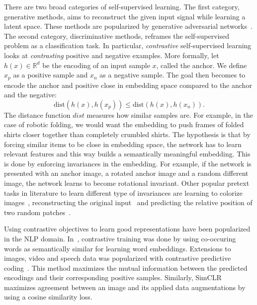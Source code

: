 \documentclass[\home/main.tex]{subfiles}
\begin{document}
There are two broad categories of self-supervised learning. The first category, generative methods, aims to reconstruct the given input signal while learning a latent space. These methods are popularized by generative adversarial networks~\autocite{goodfellow2014generative}. The second category, discriminative methods, reframes the self-supervised problem as a classification task. In particular, \emph{contrastive} self-supervised learning looks at \textit{contrasting} positive and negative examples. More formally, let $h(x) \in \mathbb{R}^d$ be the encoding of an input sample $x$, called the anchor. We define $x_p$ as a positive sample and $x_n$ as a negative sample. The goal then becomes to encode the anchor and positive close in embedding space compared to the anchor and the negative:
\begin{equation*}
	\text{dist}\left( h(x),h(x_p) \right) \leq \text{dist}\left( h(x),h(x_n) \right) .
\end{equation*}
The distance function $\textit{dist}$ measures how similar samples are. For example, in the case of robotic folding, we would want the embedding to push frames of folded shirts closer together than completely crumbled shirts. The hypothesis is that by forcing similar items to be close in embedding space, the network has to learn relevant features and this way builds a semantically meaningful embedding. This is done by enforcing invariances in the embedding. For example, if the network is presented with an anchor image, a rotated anchor image and a random different image, the network learns to become rotational invariant. Other popular pretext tasks in literature to learn different type of invariances are learning to colorize images~\cite{Zhang2016Color}, reconstructing the original input~\cite{Pathak2016} and predicting the relative position of two random patches~\cite{Doersch2015}. 


Using contrastive objectives to learn good representations have been popularized in the NLP domain. In~\autocite{mikolov2013distributed}, contrastive training was done by using co-occuring words as semantically similar for learning word embeddings. Extensions to images, video and speech data was popularized with contrastive predictive coding~\autocite{oord2018representation}. This method maximizes the mutual information between the predicted encodings and their corresponding positive samples. Similarly, SimCLR~\autocite{chen2020simple} maximizes agreement between an image and its applied data augmentations by using a cosine similarity loss. 
\end{document}
